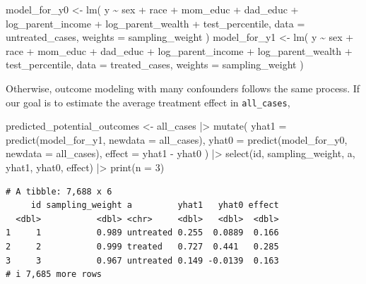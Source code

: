 \documentclass[
  letterpaper,
  DIV=11,
  numbers=noendperiod]{scrartcl}
\newenvironment{Shaded}{\begin{snugshade}}{\end{snugshade}}
\newcommand{\AttributeTok}[1]{\textcolor[rgb]{0.40,0.45,0.13}{#1}}
\newcommand{\DecValTok}[1]{\textcolor[rgb]{0.68,0.00,0.00}{#1}}
\newcommand{\FunctionTok}[1]{\textcolor[rgb]{0.28,0.35,0.67}{#1}}
\newcommand{\NormalTok}[1]{\textcolor[rgb]{0.00,0.23,0.31}{#1}}
\newcommand{\OtherTok}[1]{\textcolor[rgb]{0.00,0.23,0.31}{#1}}
\newcommand{\SpecialCharTok}[1]{\textcolor[rgb]{0.37,0.37,0.37}{#1}}
\begin{document}
\begin{Shaded}
\begin{Highlighting}[]
\NormalTok{model\_for\_y0 }\OtherTok{\textless{}{-}} \FunctionTok{lm}\NormalTok{(}
\NormalTok{  y }\SpecialCharTok{\textasciitilde{}}\NormalTok{ sex }\SpecialCharTok{+}\NormalTok{ race }\SpecialCharTok{+}\NormalTok{ mom\_educ }\SpecialCharTok{+}\NormalTok{ dad\_educ }\SpecialCharTok{+}\NormalTok{ log\_parent\_income }\SpecialCharTok{+}
\NormalTok{    log\_parent\_wealth }\SpecialCharTok{+}\NormalTok{ test\_percentile, }
  \AttributeTok{data =}\NormalTok{ untreated\_cases,}
  \AttributeTok{weights =}\NormalTok{ sampling\_weight}
\NormalTok{)}
\NormalTok{model\_for\_y1 }\OtherTok{\textless{}{-}} \FunctionTok{lm}\NormalTok{(}
\NormalTok{  y }\SpecialCharTok{\textasciitilde{}}\NormalTok{ sex }\SpecialCharTok{+}\NormalTok{ race }\SpecialCharTok{+}\NormalTok{ mom\_educ }\SpecialCharTok{+}\NormalTok{ dad\_educ }\SpecialCharTok{+}\NormalTok{ log\_parent\_income }\SpecialCharTok{+}
\NormalTok{    log\_parent\_wealth }\SpecialCharTok{+}\NormalTok{ test\_percentile, }
  \AttributeTok{data =}\NormalTok{ treated\_cases,}
  \AttributeTok{weights =}\NormalTok{ sampling\_weight}
\NormalTok{)}
\end{Highlighting}
\end{Shaded}

Otherwise, outcome modeling with many confounders follows the same
process. If our goal is to estimate the average treatment effect in
\texttt{all\_cases},

\begin{Shaded}
\begin{Highlighting}[]
\NormalTok{predicted\_potential\_outcomes }\OtherTok{\textless{}{-}}\NormalTok{ all\_cases }\SpecialCharTok{|\textgreater{}}
  \FunctionTok{mutate}\NormalTok{(}
    \AttributeTok{yhat1 =} \FunctionTok{predict}\NormalTok{(model\_for\_y1, }\AttributeTok{newdata =}\NormalTok{ all\_cases),}
    \AttributeTok{yhat0 =} \FunctionTok{predict}\NormalTok{(model\_for\_y0, }\AttributeTok{newdata =}\NormalTok{ all\_cases),}
    \AttributeTok{effect =}\NormalTok{ yhat1 }\SpecialCharTok{{-}}\NormalTok{ yhat0}
\NormalTok{  ) }\SpecialCharTok{|\textgreater{}}
  \FunctionTok{select}\NormalTok{(id, sampling\_weight, a, yhat1, yhat0, effect) }\SpecialCharTok{|\textgreater{}}
  \FunctionTok{print}\NormalTok{(}\AttributeTok{n =} \DecValTok{3}\NormalTok{)}
\end{Highlighting}
\end{Shaded}

\begin{verbatim}
# A tibble: 7,688 x 6
     id sampling_weight a         yhat1   yhat0 effect
  <dbl>           <dbl> <chr>     <dbl>   <dbl>  <dbl>
1     1           0.989 untreated 0.255  0.0889  0.166
2     2           0.999 treated   0.727  0.441   0.285
3     3           0.967 untreated 0.149 -0.0139  0.163
# i 7,685 more rows
\end{verbatim}
\end{document}
